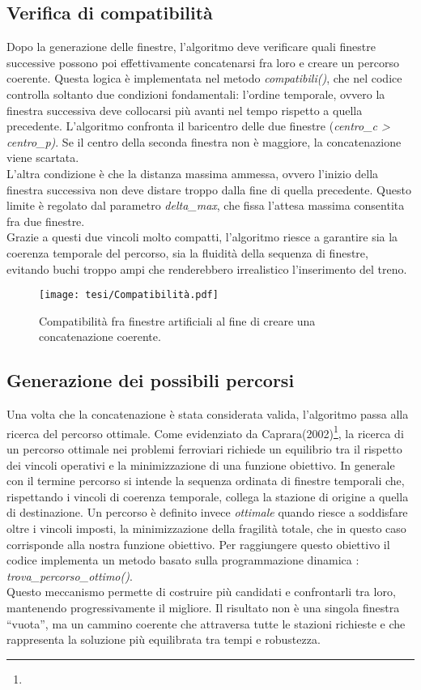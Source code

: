 \documentclass{report}
\newcommand{\fnShort}[2][]{\footnote{\footshorthand[#1]{#2}}}
\begin{document}
\subsection{Verifica di compatibilità}

Dopo la generazione delle finestre, l’algoritmo deve verificare quali finestre successive possono poi effettivamente concatenarsi fra loro e creare un percorso coerente.
Questa logica è implementata nel metodo \textit{compatibili()}, che nel codice controlla soltanto due condizioni fondamentali: l'ordine temporale, ovvero la finestra successiva deve collocarsi più avanti nel tempo rispetto a quella precedente. L'algoritmo confronta il baricentro delle due finestre (\textit{centro\_c > centro\_p)}. Se il centro della seconda finestra non è maggiore, la concatenazione viene scartata. \\ L'altra condizione è che la distanza massima ammessa, ovvero l’inizio della finestra successiva non deve distare troppo dalla fine di quella precedente. Questo limite è regolato dal parametro \textit{delta\_max}, che fissa l’attesa massima consentita fra due finestre. \\ Grazie a questi due vincoli molto compatti, l’algoritmo riesce a garantire sia la coerenza temporale del percorso, sia la fluidità della sequenza di finestre, evitando buchi troppo ampi che renderebbero irrealistico l’inserimento del treno.

\begin{figure}[H]
    \centering
    \texttt{[image: tesi/Compatibilità.pdf]}
    \caption{Compatibilità fra finestre artificiali al fine di creare una concatenazione coerente.}
    \label{fig:placeholder}
\end{figure}


\subsection{Generazione dei possibili percorsi}
Una volta che la concatenazione è stata considerata valida, l’algoritmo passa alla ricerca del percorso ottimale. Come evidenziato da Caprara(2002)\fnShort{Caprara2002}, la ricerca di un percorso ottimale nei problemi ferroviari richiede un equilibrio tra il rispetto dei vincoli operativi e la minimizzazione di una funzione obiettivo.
In generale con il termine percorso si intende la sequenza ordinata di finestre temporali che, rispettando i vincoli di coerenza temporale, collega la stazione di origine a quella di destinazione.
Un percorso è definito invece \textit{ottimale} quando riesce a soddisfare oltre i vincoli imposti, la minimizzazione della fragilità totale, che in questo caso corrisponde alla nostra funzione obiettivo.
Per raggiungere questo obiettivo il codice implementa un metodo basato sulla programmazione dinamica : \textit{trova\_percorso\_ottimo()}. \\
Questo meccanismo permette di costruire più candidati e confrontarli tra loro, mantenendo progressivamente il migliore. Il risultato non è una singola finestra “vuota”, ma un cammino coerente che attraversa tutte le stazioni richieste e che rappresenta la soluzione più equilibrata tra tempi e robustezza.
\end{document}
